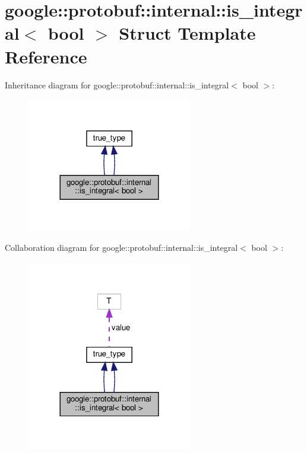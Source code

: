 \hypertarget{structgoogle_1_1protobuf_1_1internal_1_1is__integral_3_01bool_01_4}{}\section{google\+:\+:protobuf\+:\+:internal\+:\+:is\+\_\+integral$<$ bool $>$ Struct Template Reference}
\label{structgoogle_1_1protobuf_1_1internal_1_1is__integral_3_01bool_01_4}


Inheritance diagram for google\+:\+:protobuf\+:\+:internal\+:\+:is\+\_\+integral$<$ bool $>$\+:
\nopagebreak
\begin{figure}[H]
\begin{center}
\leavevmode
\includegraphics[width=204pt]{structgoogle_1_1protobuf_1_1internal_1_1is__integral_3_01bool_01_4__inherit__graph}
\end{center}
\end{figure}


Collaboration diagram for google\+:\+:protobuf\+:\+:internal\+:\+:is\+\_\+integral$<$ bool $>$\+:
\nopagebreak
\begin{figure}[H]
\begin{center}
\leavevmode
\includegraphics[width=204pt]{structgoogle_1_1protobuf_1_1internal_1_1is__integral_3_01bool_01_4__coll__graph}
\end{center}
\end{figure}
